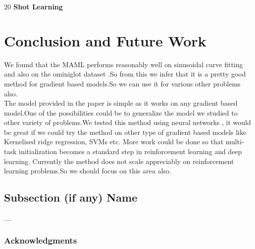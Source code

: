 \documentclass[a4paper]{article}
\begin{document}
\textbf{$20$ Shot Learning}
\begin{table}[width=\paperwidth]
\centering
{}
\end{table}

\section{Conclusion and Future Work}

We found that the MAML performs reasonably well on sinusoidal curve fitting and also on the ominiglot dataset .So from this we infer that it is a pretty good method for gradient based models.So we can use it for various other problems also.\\
The model provided in the paper is simple as it works on any gradient based model.One of the possibilities could be to generalize the model we studied  to other variety of problems.We tested this method using neural networks , it would be great if we could try the method on other type of gradient based models like Kernelised ridge regression, SVMs etc. More work could be done so that multi-task initialization becomes a standard step in reinforcement learning and deep learning.
Currently the method does not scale appreciably on reinforcement learning problems.So we should focus on this area also.

\subsection*{Subsection (if any) Name}

....

\subsubsection*{Acknowledgments}
\end{document}
